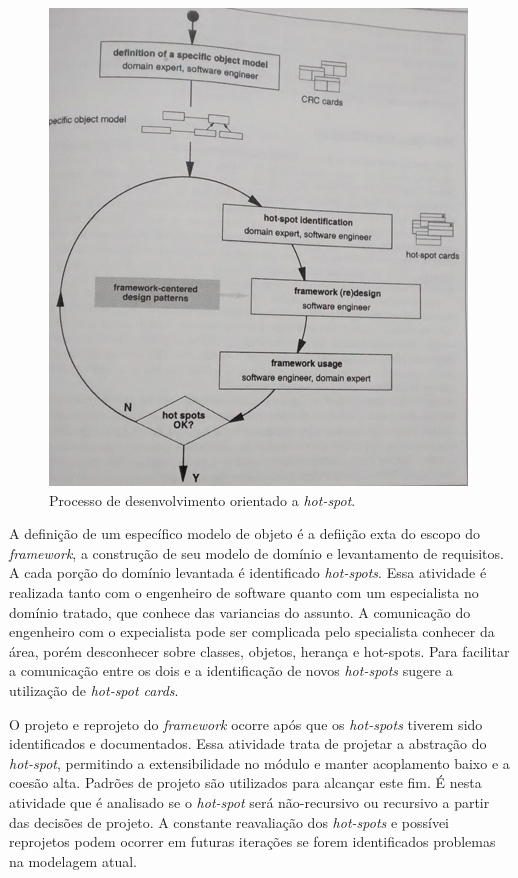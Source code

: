 \begin{figure}[h]
	\centering
	\label{fig14}
		\includegraphics[keepaspectratio=true,scale=0.4]{figuras/hotspotdd.jpg}
	\caption{Processo de desenvolvimento orientado a \textit{hot-spot}. \cite{Fayad1999}}
\end{figure}

A definição de um específico modelo de objeto é a defiição exta do escopo do \textit{framework}, a construção de seu modelo de domínio e levantamento de requisitos. A cada porção do domínio levantada é identificado \textit{hot-spots}. Essa atividade é realizada tanto com o engenheiro de software quanto com um especialista no domínio tratado, que conhece das variancias do assunto. A comunicação do engenheiro com o expecialista pode ser complicada pelo specialista conhecer da área, porém desconhecer sobre classes, objetos, herança e hot-spots. Para facilitar a comunicação entre os dois e a identificação de novos \textit{hot-spots} \cite{Fayad1999} sugere a utilização de \textit{hot-spot cards}.

O projeto e reprojeto do \textit{framework} ocorre após que os \textit{hot-spots} tiverem sido identificados e documentados. Essa atividade trata de projetar a abstração do \textit{hot-spot}, permitindo a extensibilidade no módulo e manter acoplamento baixo e a coesão alta. Padrões de projeto são utilizados para alcançar este fim. É nesta atividade que é analisado se o \textit{hot-spot} será não-recursivo ou recursivo a partir das decisões de projeto. A constante reavaliação dos \textit{hot-spots} e possívei reprojetos podem ocorrer em futuras iterações se forem identificados problemas na modelagem atual.


